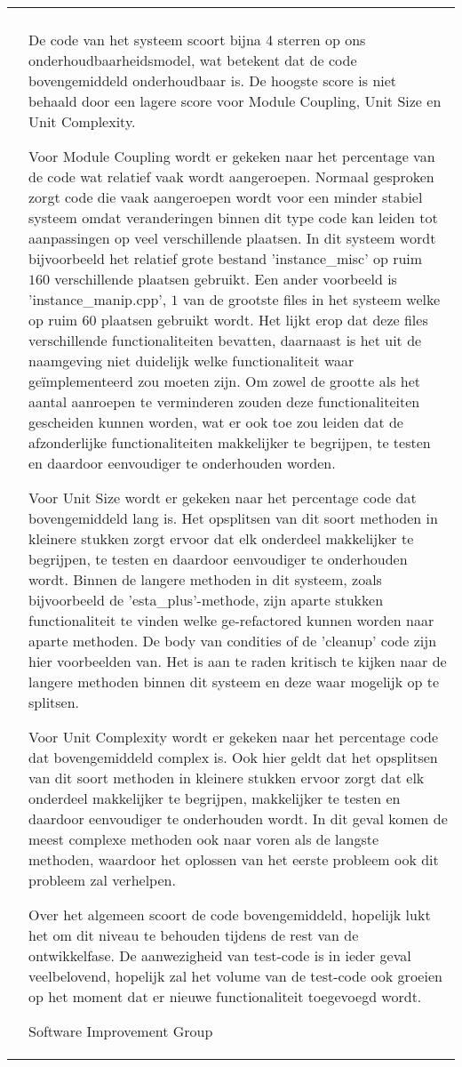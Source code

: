 \begin{tabular}{p{0.5cm} | p{\textwidth - 2cm} |}
\cline{2-2}
 & \\ & \setlength{\parskip}{5pt}
De code van het systeem scoort bijna 4 sterren op ons onderhoudbaarheidsmodel, wat betekent dat de code bovengemiddeld onderhoudbaar is. De hoogste score is niet behaald door een lagere score voor Module Coupling, Unit Size en Unit Complexity.

Voor Module Coupling wordt er gekeken naar het percentage van de code wat relatief vaak wordt aangeroepen. Normaal gesproken zorgt code die vaak aangeroepen wordt voor een minder stabiel systeem omdat veranderingen binnen dit type code kan leiden tot aanpassingen op veel verschillende plaatsen. In dit systeem wordt bijvoorbeeld het relatief grote bestand 'instance\_misc' op ruim $160$ verschillende plaatsen gebruikt. Een ander voorbeeld is 'instance\_manip.cpp', $1$ van de grootste files in het systeem welke op ruim $60$ plaatsen gebruikt wordt. Het lijkt erop dat deze files verschillende functionaliteiten bevatten, daarnaast is het uit de naamgeving niet duidelijk welke functionaliteit waar geïmplementeerd zou moeten zijn. Om zowel de grootte als het aantal aanroepen te verminderen zouden deze functionaliteiten gescheiden kunnen worden, wat er ook toe zou leiden dat de afzonderlijke functionaliteiten makkelijker te begrijpen, te testen en daardoor eenvoudiger te onderhouden worden.

Voor Unit Size wordt er gekeken naar het percentage code dat bovengemiddeld lang is. Het opsplitsen van dit soort methoden in kleinere stukken zorgt ervoor dat elk onderdeel makkelijker te begrijpen, te testen en daardoor eenvoudiger te onderhouden wordt. Binnen de langere methoden in dit systeem, zoals bijvoorbeeld de 'esta\_plus'-methode, zijn aparte stukken functionaliteit te vinden welke ge-refactored kunnen worden naar aparte methoden. De body van condities of de 'cleanup' code zijn hier voorbeelden van. Het is aan te raden kritisch te kijken naar de langere methoden binnen dit systeem en deze waar mogelijk op te splitsen.

Voor Unit Complexity wordt er gekeken naar het percentage code dat bovengemiddeld complex is. Ook hier geldt dat het opsplitsen van dit soort methoden in kleinere stukken ervoor zorgt dat elk onderdeel makkelijker te begrijpen, makkelijker te testen en daardoor eenvoudiger te onderhouden wordt. In dit geval komen de meest complexe methoden ook naar voren als de langste methoden, waardoor het oplossen van het eerste probleem ook dit probleem zal verhelpen.

Over het algemeen scoort de code bovengemiddeld, hopelijk lukt het om dit niveau te behouden tijdens de rest van de ontwikkelfase. De aanwezigheid van test-code is in ieder geval veelbelovend, hopelijk zal het volume van de test-code ook groeien op het moment dat er nieuwe functionaliteit toegevoegd wordt. 

\hfill Software Improvement Group \\
\cline{2-2}
\end{tabular}


